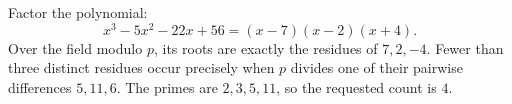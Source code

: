 Factor the polynomial:
\[
x^3-5x^2-22x+56=(x-7)(x-2)(x+4).
\]
Over the field modulo $p$, its roots are exactly the residues of $7,2,-4$. Fewer than three distinct residues occur precisely when $p$ divides one of their pairwise differences $5,11,6$. The primes are $\boxed{2,3,5,11}$, so the requested count is $\boxed4$.
